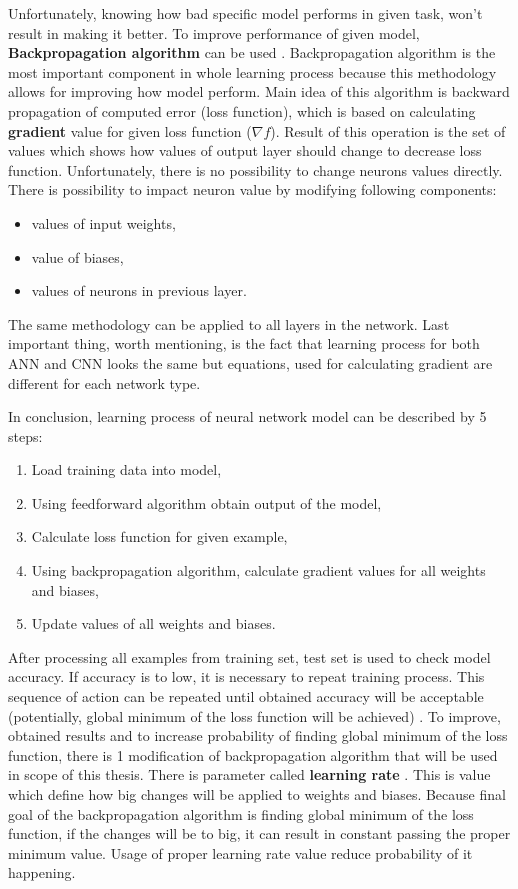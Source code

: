     Unfortunately, knowing how bad specific model performs in given task, won't result in making it better. To improve performance of given model, \textbf{Backpropagation algorithm} can be used \cite{bib:book-make-own-neural-network,bib:internet-convolutions-and-backpropagation}. Backpropagation algorithm is the most important component in whole learning process because this methodology allows for improving how model perform. Main idea of this algorithm is backward propagation of computed error (loss function), which is based on calculating \textbf{gradient} value for given loss function ($\nabla f$). Result of this operation is the set of values which shows how values of output layer should change to decrease loss function. Unfortunately, there is no possibility to change neurons values directly. There is possibility to impact neuron value by modifying following components: 
    \begin{itemize}
        \item values of input weights,
        \item value of biases,
        \item values of neurons in previous layer.
    \end{itemize}
    The same methodology can be applied to all layers in the network. Last important thing, worth mentioning, is the fact that learning process for both ANN and CNN looks the same but equations, used for calculating gradient are different for each network type.

    In conclusion, learning process of neural network model can be described by 5 steps:
    \begin{enumerate}
        \item Load training data into model,
        \item Using feedforward algorithm obtain output of the model,
        \item Calculate loss function for given example,
        \item Using backpropagation algorithm, calculate gradient values for all weights and biases,
        \item Update values of all weights and biases.
    \end{enumerate}
    After processing all examples from training set, test set is used to check model accuracy. If accuracy is to low, it is necessary to repeat training process. This sequence of action can be repeated until obtained accuracy will be acceptable (potentially, global minimum of the loss function will be achieved) \cite{bib:internet-aa-cnn-lecture,bib:book-make-own-neural-network}. To improve, obtained results and to increase probability of finding global minimum of the loss function, there is 1 modification of backpropagation algorithm that will be used in scope of this thesis. There is parameter called \textbf{learning rate} \cite{bib:internet-learning-rate}. This is value which define how big changes will be applied to weights and biases. Because final goal of the backpropagation algorithm is finding global minimum of the loss function, if the changes will be to big, it can result in constant passing the proper minimum value. Usage of proper learning rate value reduce probability of it happening.

